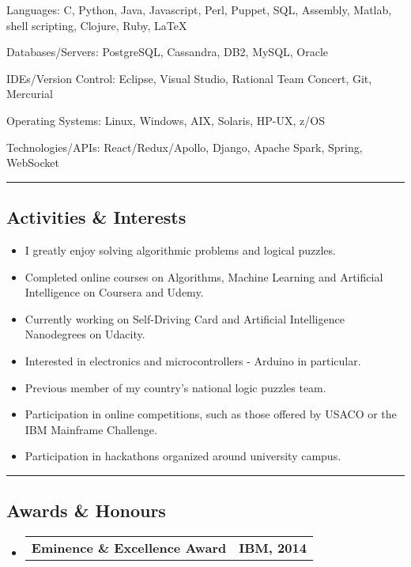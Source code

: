 \documentclass[10pt,letterpaper]{article}
\makeatletter
\newenvironment{indentsection}[1]%
{\begin{list}{}%
    {\setlength{\leftmargin}{#1}}%
    \item[]%
}
{\end{list}}
\newcommand{\headerrow}[2]
{\begin{tabular*}{\linewidth}{l@{\extracolsep{\fill}}r}
    #1 &
    #2 \\
\end{tabular*}}
\makeatother
\begin{document}
\begin{indentsection}{\parindent}
\begin{description*}
    \item[Languages:]
    C, Python, Java, Javascript, Perl, Puppet, SQL, Assembly, Matlab, shell scripting, Clojure, Ruby, \LaTeX
    \item[Databases/Servers:]
    PostgreSQL, Cassandra, DB2, MySQL, Oracle
    \item[IDEs/Version Control:]
    Eclipse, Visual Studio, Rational Team Concert, Git, Mercurial
    \item[Operating Systems:]
    Linux, Windows, AIX, Solaris, HP-UX, z/OS
    \item[Technologies/APIs:] React/Redux/Apollo, Django, Apache Spark, Spring, WebSocket

\end{description*}
\end{indentsection}

\hrule
\vspace{-0.4em}
\subsection*{Activities \& Interests}

\begin{itemize}
    \parskip=0.1em

    \item I greatly enjoy solving algorithmic problems and logical puzzles.
    \item Completed online courses on Algorithms, Machine Learning and Artificial Intelligence on Coursera and Udemy.
    \item Currently working on Self-Driving Card and Artificial Intelligence Nanodegrees on Udacity.
    \item Interested in electronics and microcontrollers - Arduino in particular.
    \item Previous member of my country's national logic puzzles team.
    \item Participation in online competitions, such as those offered by USACO or the IBM Mainframe Challenge.
    \item Participation in hackathons organized around university campus.

\end{itemize}

\hrule
\vspace{-0.4em}
\subsection*{Awards \& Honours}

\begin{itemize}
    \parskip=0.1em
    \item
    \headerrow
        {\textbf{Eminence \& Excellence Award}}
        {\textbf{IBM, 2014}}

\end{itemize}
\end{document}
